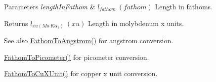 \begin{DoxyParams}{Parameters}
{\em length\+In\+Fathom} & $ l_{fathom}\ (fathom)$ Length in fathoms. \\
\hline
\end{DoxyParams}
\begin{DoxyReturn}{Returns}
$ l_{xu(Mo\ K\alpha_1)}\ (xu)$ Length in molybdenum x units. 
\end{DoxyReturn}
\begin{DoxySeeAlso}{See also}
\mbox{\hyperlink{group___e_g_x_math-_conversions-_length_conversions-_nautical-_fathom-_non-_s_i_gac03859840078c2a19cbf1f79bcf2b919}{Fathom\+To\+Angstrom()}} for angstrom conversion. 

\mbox{\hyperlink{group___e_g_x_math-_conversions-_length_conversions-_nautical-_fathom-_s_i_gad5fe5d3a1a48420dc43cd2826a9b6f71}{Fathom\+To\+Picometer()}} for picometer conversion. 

\mbox{\hyperlink{group___e_g_x_math-_conversions-_length_conversions-_nautical-_fathom-_non-_s_i_ga6692d3fad4af03d78145e34bf0a6c2ac}{Fathom\+To\+Cu\+X\+Unit()}} for copper x unit conversion. 
\end{DoxySeeAlso}

